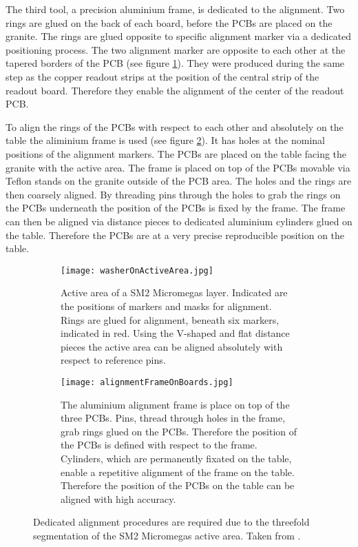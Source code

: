 \documentclass[
twoside,            %
BCOR1.4cm,          %
10pt,               %
headings=normal,    %
headsepline,        %
clearplainpage,		%
final,              %
div=14,
open=right,
bibliography=toc
]{scrreprt}
\begin{document}
The third tool, a precision aluminium frame, is dedicated to the alignment.
Two rings are glued on the back of each board, before the PCBs are placed on the granite.
The rings are glued opposite to specific alignment marker via a dedicated positioning process.
The two alignment marker are opposite to each other at the tapered borders of the PCB (see figure \ref{washerOnActiveArea}). 
They were produced during the same step as the copper readout strips at the position of the central strip of the readout board.
Therefore they enable the alignment of the center of the readout PCB.

To align the rings of the PCBs with respect to each other and absolutely on the table the aliminium frame is used (see figure \ref{alignmentFrameOnBoards}).
It has holes at the nominal positions of the alignment markers.
The PCBs are placed on the table facing the granite with the active area.
The frame is placed on top of the PCBs movable via Teflon stands on the granite outside of the PCB area.
The holes and the rings are then coarsely aligned. 
By threading pins through the holes to grab the rings on the PCBs underneath the position of the PCBs is fixed by the frame.
The frame can then be aligned via distance pieces to dedicated aluminium cylinders glued on the table.
Therefore the PCBs are at a very precise reproducible position on the table.

\begin{figure}[!h]
	\begin{subfigure}[b]{0.48\textwidth}
		\centering
		\texttt{[image: washerOnActiveArea.jpg]}
		\caption{
			Active area of a SM2 Micromegas layer.
			Indicated are the positions of markers and masks for alignment.
			Rings are glued for alignment, beneath six markers, indicated in red.
			Using the V-shaped and flat distance pieces the active area can be aligned absolutely with respect to reference pins.
		}
		\label{washerOnActiveArea} 
	\end{subfigure}
	\hfill
	\begin{subfigure}[b]{0.48\textwidth}
			\centering
		{\texttt{[image: alignmentFrameOnBoards.jpg]}}
		\caption{
			The aluminium alignment frame is place on top of the three PCBs.
			Pins, thread through holes in the frame, grab rings glued on the PCBs.
			Therefore the position of the PCBs is defined with respect to the frame.
			Cylinders, which are permanently fixated on the table, enable a repetitive alignment of the frame on the table.
			Therefore the position of the PCBs on the table can be aligned with high accuracy. 
		}
		\label{alignmentFrameOnBoards} 
	\end{subfigure}
	\vspace{-2mm}
	\caption{
		Dedicated alignment procedures are required due to the threefold segmentation of the SM2 Micromegas active area.
		Taken from \cite{hertenbergerMicromegas}.
	}
	\label{alignmentProcedure} 
\end{figure}
\end{document}
